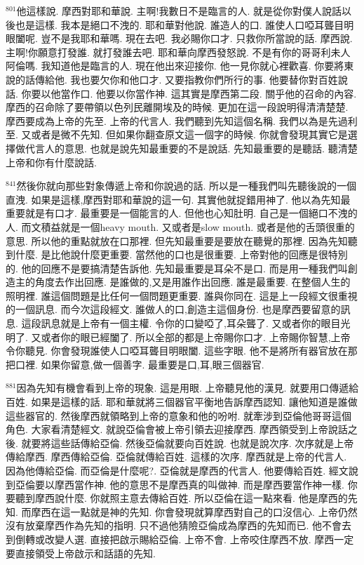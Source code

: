 \documentclass{book}
\begin{document}
$^{801}$他這樣說.
摩西對耶和華說.
主啊!我數日不是臨言的人.
就是從你對僕人說話以後也是這樣.
我本是絕口不洩的.
耶和華對他說.
誰造人的口.
誰使人口啞耳聾目明眼闔呢.
豈不是我耶和華嗎.
現在去吧.
我必賜你口才.
只救你所當說的話.
摩西說.
主啊!你願意打發誰.
就打發誰去吧.
耶和華向摩西發怒說.
不是有你的哥哥利未人阿倫嗎.
我知道他是臨言的人.
現在他出來迎接你.
他一見你就心裡歡喜.
你要將東說的話傳給他.
我也要欠你和他口才.
又要指教你們所行的事.
他要替你對百姓說話.
你要以他當作口.
他要以你當作神.
這其實是摩西第二段.
關乎他的召命的內容.
摩西的召命除了要帶領以色列民離開埃及的時候.
更加在這一段說明得清清楚楚.
摩西要成為上帝的先至.
上帝的代言人.
我們聽到先知這個名稱.
我們以為是先過利至.
又或者是微不先知.
但如果你翻查原文這一個字的時候.
你就會發現其實它是選擇做代言人的意思.
也就是說先知最重要的不是說話.
先知最重要的是聽話.
聽清楚上帝和你有什麼說話.

$^{841}$然後你就向那些對象傳遞上帝和你說過的話.
所以是一種我們叫先聽後說的一個直洩.
如果是這樣,摩西對耶和華說的這一句.
其實他就捉錯用神了.
他以為先知最重要就是有口才.
最重要是一個能言的人.
但他也心知肚明.
自己是一個絕口不洩的人.
而文積益就是一個heavy mouth.
又或者是slow mouth.
或者是他的舌頭很重的意思.
所以他的重點就放在口那裡.
但先知最重要是要放在聽覺的那裡.
因為先知聽到什麼.
是比他說什麼更重要.
當然他的口也是很重要.
上帝對他的回應是很特別的.
他的回應不是要搞清楚告訴他.
先知最重要是耳朵不是口.
而是用一種我們叫創造主的角度去作出回應.
是誰做的,又是用誰作出回應.
誰是最重要.
在整個人生的照明裡.
誰這個問題是比任何一個問題更重要.
誰與你同在.
這是上一段經文很重視的一個訊息.
而今次這段經文.
誰做人的口,創造主這個身份.
也是摩西要留意的訊息.
這段訊息就是上帝有一個主權.
令你的口變啞了,耳朵聾了.
又或者你的眼目光明了.
又或者你的眼已經闔了.
所以全部的都是上帝賜你口才.
上帝賜你智慧,上帝令你聽見.
你會發現誰使人口啞耳聾目明眼闔.
這些字眼.
他不是將所有器官放在那把口裡.
如果你留意,做一個善字.
最重要是口,耳,眼三個器官.

$^{881}$因為先知有機會看到上帝的現象.
這是用眼.
上帝聽見他的漢見.
就要用口傳遞給百姓.
如果是這樣的話.
耶和華就將三個器官平衡地告訴摩西認知.
讓他知道是誰做這些器官的.
然後摩西就領略到上帝的意象和他的吩咐.
就牽涉到亞倫他哥哥這個角色.
大家看清楚經文.
就說亞倫會被上帝引領去迎接摩西.
摩西領受到上帝說話之後.
就要將這些話傳給亞倫.
然後亞倫就要向百姓說.
也就是說次序.
次序就是上帝傳給摩西.
摩西傳給亞倫.
亞倫就傳給百姓.
這樣的次序.
摩西就是上帝的代言人.
因為他傳給亞倫.
而亞倫是什麼呢?.
亞倫就是摩西的代言人.
他要傳給百姓.
經文說到亞倫要以摩西當作神.
他的意思不是摩西真的叫做神.
而是摩西要當作神一樣.
你要聽到摩西說什麼.
你就照主意去傳給百姓.
所以亞倫在這一點來看.
他是摩西的先知.
而摩西在這一點就是神的先知.
你會發現就算摩西對自己的口沒信心.
上帝仍然沒有放棄摩西作為先知的指明.
只不過他猜險亞倫成為摩西的先知而已.
他不會去到倒轉或改變人選.
直接把啟示賜給亞倫.
上帝不會.
上帝咬住摩西不放.
摩西一定要直接領受上帝啟示和話語的先知.
\end{document}
